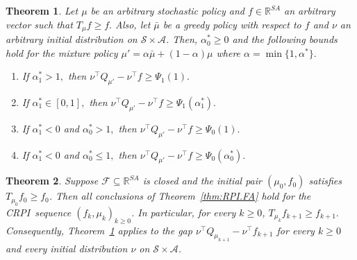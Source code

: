 \documentclass[twoside]{article}
\theoremstyle{plain}
\newtheorem{theorem}{Theorem}[section]
\theoremstyle{definition}
\theoremstyle{remark}
\newcommand{\tr}{\top}
\newcommand{\bR}{\mathbb{R}}
\newcommand{\mup}{\mu'}
\newcommand{\mub}{\bar{\mu}}
\newcommand{\alS}{\alpha^*}
\newcommand{\CRPI}{CRPI}
\newcommand{\cA}{\mathcal{A}}
\newcommand{\cS}{\mathcal{S}}
\newcommand{\cF}{\mathcal{F}}
\begin{document}
\begin{theorem}
\label{thm:perf.bds.FA}
    Let $\mu$ be an arbitrary stochastic policy and $f \in \bR^{SA}$ an arbitrary vector such that $T_{\mu} f \geq f.$ Also, let $\mub$ be a greedy policy with respect to $f$ and $\nu$ an arbitrary initial distribution on  $\cS \times \cA$. Then, $\alS_0 \geq 0$ and the following bounds hold for the mixture policy $\mup = \alpha \mub + (1 - \alpha) \mu$ where $\alpha = \min\{1, \alS\}.$
    \begin{enumerate}
        \item If $\alS_1 > 1,$ then $\nu^\tr Q_{\mup} - \nu^\tr f \geq \Psi_1(1).$

        \item If $\alS_1 \in [0, 1],$ then $\nu^\tr Q_{\mup} - \nu^\tr f \geq \Psi_1(\alS_1).$

        \item If $\alS_1 < 0$ and $\alS_0 > 1,$ then $\nu^\tr Q_{\mup} - \nu^\tr f \geq \Psi_0(1).$

        \item If $\alS_1 < 0$\! and $\alS_0 \leq 1,$\! then $\nu^\tr Q_{\mup} - \nu^\tr f \geq \Psi_0(\alS_0).$
    \end{enumerate}
\end{theorem}

\begin{theorem}
\label{thm:CRPI.FA}
Suppose \(\cF\subseteq \bR^{SA}\) is closed and the initial pair \((\mu_0,f_0)\) satisfies \(T_{\mu_0}f_0 \ge f_0\). Then all conclusions of Theorem~\ref{thm:RPI.FA} hold for the \CRPI\ sequence \((f_k,\mu_k)_{k\ge 0}\). In particular, for every \(k\ge 0\), $T_{\mu_k} f_{k+1} \ge f_{k+1}.$
Consequently, Theorem~\ref{thm:perf.bds.FA} applies to the gap $\nu^\tr Q_{\mu_{k+1}} - \nu^\tr f_{k+1}$ for every \(k\ge 0\) and every initial distribution \(\nu\) on \(\cS\times\cA\).
\end{theorem}


\end{document}
